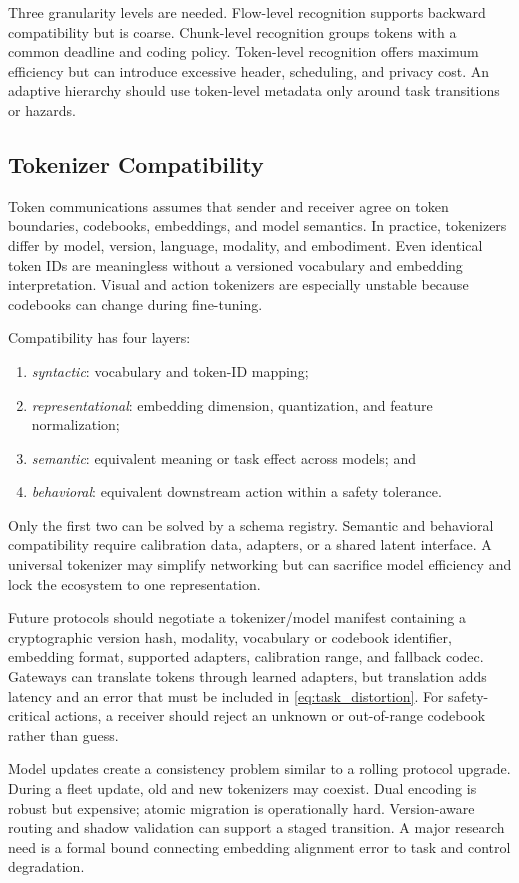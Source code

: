 \documentclass[letterpaper,journal]{IEEEtran}
\begin{document}
Three granularity levels are needed. Flow-level recognition supports backward
compatibility but is coarse. Chunk-level recognition groups tokens with a
common deadline and coding policy. Token-level recognition offers maximum
efficiency but can introduce excessive header, scheduling, and privacy cost.
An adaptive hierarchy should use token-level metadata only around task
transitions or hazards.

\subsection{Tokenizer Compatibility}
Token communications assumes that sender and receiver agree on token
boundaries, codebooks, embeddings, and model semantics. In practice,
tokenizers differ by model, version, language, modality, and embodiment.
Even identical token IDs are meaningless without a versioned vocabulary and
embedding interpretation. Visual and action tokenizers are especially
unstable because codebooks can change during fine-tuning.

Compatibility has four layers:
\begin{enumerate}
\item \emph{syntactic}: vocabulary and token-ID mapping;
\item \emph{representational}: embedding dimension, quantization, and feature
normalization;
\item \emph{semantic}: equivalent meaning or task effect across models; and
\item \emph{behavioral}: equivalent downstream action within a safety
tolerance.
\end{enumerate}
Only the first two can be solved by a schema registry. Semantic and behavioral
compatibility require calibration data, adapters, or a shared latent
interface. A universal tokenizer may simplify networking but can sacrifice
model efficiency and lock the ecosystem to one representation.

Future protocols should negotiate a tokenizer/model manifest containing a
cryptographic version hash, modality, vocabulary or codebook identifier,
embedding format, supported adapters, calibration range, and fallback codec.
Gateways can translate tokens through learned adapters, but translation adds
latency and an error that must be included in
\eqref{eq:task_distortion}. For safety-critical actions, a receiver should
reject an unknown or out-of-range codebook rather than guess.

Model updates create a consistency problem similar to a rolling protocol
upgrade. During a fleet update, old and new tokenizers may coexist. Dual
encoding is robust but expensive; atomic migration is operationally hard.
Version-aware routing and shadow validation can support a staged transition.
A major research need is a formal bound connecting embedding alignment error
to task and control degradation.
\end{document}
